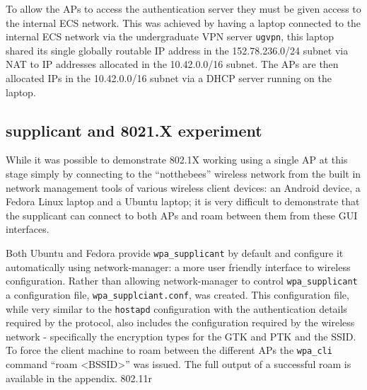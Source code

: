 \documentclass[pdftex, 12pt, a4paper]{article}
\begin{document}
To allow the APs to access the authentication server they must be given access to the internal ECS network.  This was achieved by having a laptop connected to the internal ECS network via the undergraduate VPN server \verb`ugvpn`, this laptop shared its single globally routable IP address in the 152.78.236.0/24 subnet via NAT to IP addresses allocated in the 10.42.0.0/16 subnet.  The APs are then allocated IPs in the 10.42.0.0/16 subnet via a DHCP server running on the laptop.



\subsection{supplicant and 8021.X experiment}
While it was possible to demonstrate 802.1X working using a single AP at this stage simply by connecting to the ``notthebees'' wireless network from the built in network management tools of various wireless client devices: an Android device, a Fedora Linux laptop and a Ubuntu laptop; it is very difficult to demonstrate that the supplicant can connect to both APs and roam between them from these GUI interfaces.

Both Ubuntu and Fedora provide \verb`wpa_supplicant` by default and configure it automatically using network-manager: a more user friendly interface to wireless configuration.  Rather than allowing network-manager to control \verb`wpa_supplicant` a configuration file, \verb`wpa_supplciant.conf`, was created. This configuration file, while very similar to the \verb`hostapd` configuration with the authentication details required by the protocol, also includes the configuration required by the wireless network - specifically the encryption types for the GTK and PTK and the SSID.  To force the client machine to roam between the different APs the \verb`wpa_cli` command ``roam <BSSID>'' was issued.  The full output of a successful roam is available in the appendix.
802.11r


\end{document}
